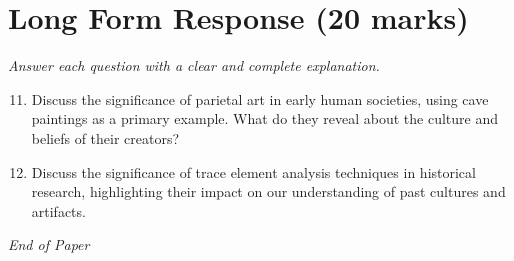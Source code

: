 \documentclass[12pt]{article}
\begin{document}
\section*{Long Form Response (20 marks)}
\textit{Answer each question with a clear and complete explanation.}
\begin{enumerate}[label=\arabic*.]
\setcounter{enumi}{10}
\item Discuss the significance of parietal art in early human societies, using cave paintings as a primary example. What do they reveal about the culture and beliefs of their creators?
\item Discuss the significance of trace element analysis techniques in historical research, highlighting their impact on our understanding of past cultures and artifacts.
\end{enumerate}

\vfill
\noindent\textit{End of Paper}
\end{document}
